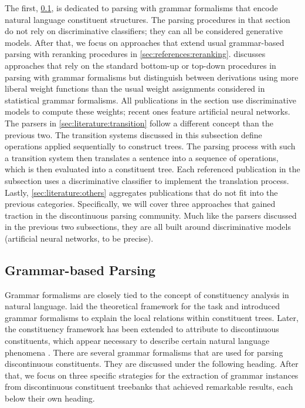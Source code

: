 \documentclass[../document.tex]{subfiles}
\begin{document}
    The first, \cref{sec:literature:grammar}, is dedicated to parsing with grammar formalisms that encode natural language constituent structures.
    The parsing procedures in that section do not rely on discriminative classifiers; they can all be considered generative models.
    After that, we focus on approaches that extend usual grammar-based parsing with reranking procedures in \cref{sec:references:reranking}.
     discusses approaches that rely on the standard bottom-up or top-down procedures in parsing with grammar formalisms but distinguish between derivations using more liberal weight functions than the usual weight assignments considered in statistical grammar formalisms.
    All publications in the section use discriminative models to compute these weights; recent ones feature artificial neural networks.
    The parsers in \cref{sec:literature:transition} follow a different concept than the previous two.
    The transition systems discussed in this subsection define operations applied sequentially to construct trees.
    The parsing process with such a transition system then translates a sentence into a sequence of operations, which is then evaluated into a constituent tree.
    Each referenced publication in the subsection uses a discriminative classifier to implement the translation process.
    Lastly, \cref{sec:literature:others} aggregates publications that do not fit into the previous categories.
    Specifically, we will cover three approaches that gained traction in the discontinuous parsing community.
    Much like the parsers discussed in the previous two subsections, they are all built around discriminative models (artificial neural networks, to be precise).

    \subsection{Grammar-based Parsing}\label{sec:literature:grammar}
    Grammar formalisms are closely tied to the concept of constituency analysis in natural language.
     laid the theoretical framework for the task and introduced grammar formalisms to explain the local relations within constituent trees.
    Later, the constituency framework has been extended to attribute to discontinuous constituents, which appear necessary to describe certain natural language phenomena \citep{Shieber85}.
    There are several grammar formalisms that are used for parsing discontinuous constituents.
    They are discussed under the following heading.
    After that, we focus on three specific strategies for the extraction of grammar instances from discontinuous constituent treebanks that achieved remarkable results, each below their own heading.
\end{document}

